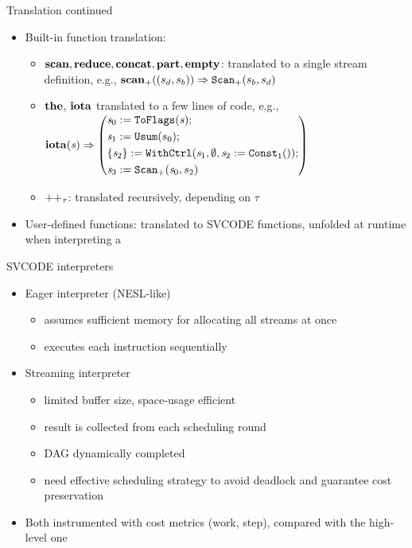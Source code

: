 \documentclass{beamer}
\begin{document}
\begin{frame}{Translation continued}
	\begin{itemize}
		 \item Built-in function translation: 
		\begin{itemize}
			\item $\*{scan}, \*{reduce}, \*{concat}, \*{part}, \*{empty}$: translated to a single stream definition, e.g., 
			${\*{scan}_+}{((s_d,s_b))} \Ra {\genscan_{+}(s_b,s_d)}$
			\item $\*{the}$, $\*{iota}$ translated to a few lines of code, e.g.,
			$\iota{\s} \Ra \left(
			 \begin{aligned}
			 & \sdef{\s_0}{\toflag(\s)} ; \\ 
			 & \sdef{\s_1}{\usum(s_0)} ; \\
			 & \withctrl{\s_1}{\sdef{\s_2}{\consta{1}()}}{\emptyset}{\{\s_2\}}; \\
			 & \sdef{\s_3}{\genscan_{+}(\s_0,s_2)}
			 \end{aligned} 
			 \right)$
			 
			\item $\*{++}_{\tau}$: translated recursively, depending on $\tau$
\pause
		\end{itemize}
		\item User-defined functions: translated to SVCODE functions, unfolded at runtime when interpreting a \sc 
	\end{itemize}
\end{frame}

\begin{frame}{SVCODE interpreters}
\begin{itemize}
	\item Eager interpreter (NESL-like) 
	\begin{itemize}
		\item assumes sufficient memory for allocating all streams at once
		\item executes each instruction sequentially 
	\end{itemize}
	\item Streaming interpreter
	\begin{itemize}
		\item limited buffer size, space-usage efficient
		\item result is collected from  each scheduling round
		\item DAG dynamically completed
		\item need effective scheduling strategy to avoid deadlock and guarantee cost preservation
	\end{itemize} 
	
	\item Both instrumented with cost metrics (work, step), compared with the high-level one 
\end{itemize}
\end{frame}
\end{document}
